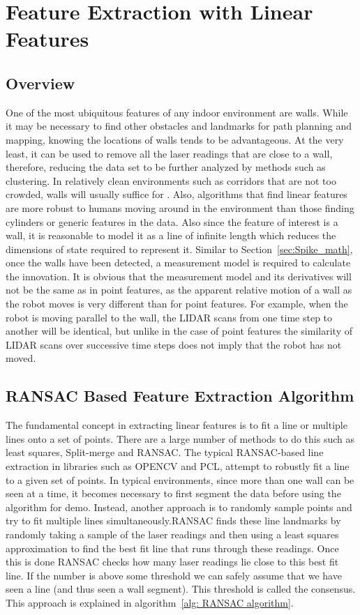 \section{Feature Extraction with Linear Features}
\label{sec:extraction}
\subsection{Overview}
One of the most ubiquitous features of any indoor environment are walls. While it may be necessary to find other obstacles and landmarks for path planning and mapping, knowing the locations of walls tends to be advantageous. At the very least, it can be used to remove all the laser readings that are close to a wall, therefore, reducing the data set to be further analyzed by methods such as clustering. In relatively clean environments such as corridors that are not too crowded, walls will usually suffice for \slam. Also, algorithms that find linear features are more robust to humans moving around in the environment than those finding cylinders or generic features in the data. Also since the feature of interest is a wall, it is reasonable to model it as a line of infinite length which reduces the dimensions of state required to represent it. Similar to Section~\ref{sec:Spike_math}, once the walls have been detected, a measurement model is required to calculate the innovation. It is obvious that the measurement model and its derivatives will not be the same as in point features, as the apparent relative motion of a wall as the robot moves is very different than for point features. For example, when the robot is moving parallel to the wall, the LIDAR scans from one time step to another will be identical, but unlike in the case of point features the similarity of LIDAR scans over successive time steps does not imply that the robot has not moved.

\subsection{RANSAC Based Feature Extraction Algorithm}
\label{sec:ransac}
The fundamental concept in extracting linear features is to fit a line or multiple lines onto a set of points. There are a large number of methods to do this such as least squares, Split-merge and RANSAC\cite{Nguyen2005}. The typical RANSAC-based line extraction in libraries such as OPENCV and PCL, attempt to robustly fit a line to a given set of points. In typical environments, since more than one wall can be seen at a time, it becomes necessary to first segment the data before using the algorithm for demo. Instead, another approach is to randomly sample points and try to fit multiple lines simultaneously.RANSAC finds these line landmarks by randomly taking a sample of the laser readings and then using a least squares approximation to find the best fit line that runs  through these readings. Once this is done RANSAC checks how many laser readings  lie close to this best fit line. If the number is above some threshold we can safely  assume that we have seen a line (and thus seen a wall segment). This threshold is  called the consensus. This approach is explained in algorithm~\ref{alg: RANSAC algorithm}\cite{riisgaard2003slam}. 

